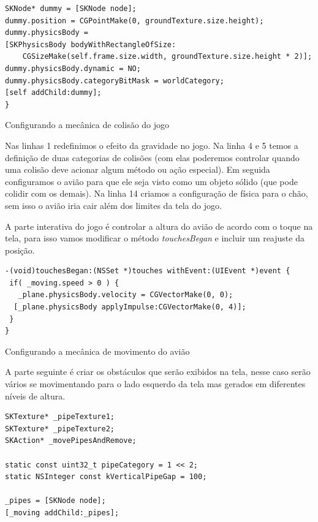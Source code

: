 \documentclass[a4paper,12pt,brazil,doubleside]{book}
\begin{document}
\begin{singlespace}
\begin{listing}[H]
\begin{verbatim}
SKNode* dummy = [SKNode node];
dummy.position = CGPointMake(0, groundTexture.size.height);
dummy.physicsBody = 
[SKPhysicsBody bodyWithRectangleOfSize:
	CGSizeMake(self.frame.size.width, groundTexture.size.height * 2)];
dummy.physicsBody.dynamic = NO;
dummy.physicsBody.categoryBitMask = worldCategory;
[self addChild:dummy];       
}
\end{verbatim}
\caption{Configurando a mecânica de colisão do jogo}
\end{listing}

Nas linhas 1 redefinimos o efeito da gravidade no jogo. Na linha 4 e 5 temos a definição de duas categorias de colisões (com elas poderemos controlar quando uma colisão deve acionar algum método ou ação especial). Em seguida configuramos o avião para que ele seja visto como um objeto sólido (que pode colidir com os demais). Na linha 14 criamos a configuração de física para o chão, sem isso o avião iria cair além dos limites da tela do jogo.

A parte interativa do jogo é controlar a altura do avião de acordo com o toque na tela, para isso vamos modificar o método \emph{touchesBegan} e incluir um reajuste da posição.

\begin{listing}[H]
\begin{verbatim}
-(void)touchesBegan:(NSSet *)touches withEvent:(UIEvent *)event {
 if( _moving.speed > 0 ) {
   _plane.physicsBody.velocity = CGVectorMake(0, 0);
  [_plane.physicsBody applyImpulse:CGVectorMake(0, 4)];
 }  
}
\end{verbatim}
\caption{Configurando a mecânica de movimento do avião}
\end{listing}

A parte seguinte é criar os obstáculos que serão exibidos na tela, nesse caso serão vários se movimentando para o lado esquerdo da tela mas gerados em diferentes níveis de altura.

\begin{listing}[H]
\begin{verbatim}
SKTexture* _pipeTexture1;
SKTexture* _pipeTexture2;
SKAction* _movePipesAndRemove;
    
static const uint32_t pipeCategory = 1 << 2;
static NSInteger const kVerticalPipeGap = 100;

_pipes = [SKNode node];
[_moving addChild:_pipes];


\end{verbatim}
\end{listing}
\end{singlespace}
\end{document}
